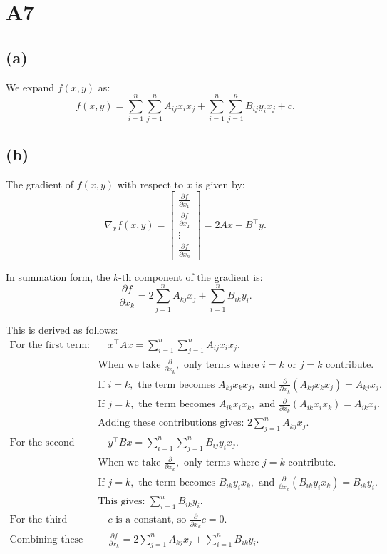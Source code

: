 \documentclass{article}
\begin{document}
\section*{A7}

\subsection*{(a)}
We expand \(f(x, y)\) as:
\[
f(x, y) = \sum_{i=1}^n \sum_{j=1}^n A_{ij} x_i x_j + \sum_{i=1}^n \sum_{j=1}^n B_{ij} y_i x_j + c.
\]

\subsection*{(b)}
The gradient of \(f(x, y)\) with respect to \(x\) is given by:
\[
\nabla_x f(x, y) = \begin{bmatrix}
\frac{\partial f}{\partial x_1} \\
\frac{\partial f}{\partial x_2} \\
\vdots \\
\frac{\partial f}{\partial x_n}
\end{bmatrix}
= 2A x + B^\top y.
\]

In summation form, the \(k\)-th component of the gradient is:
\[
\frac{\partial f}{\partial x_k} = 2 \sum_{j=1}^n A_{kj} x_j + \sum_{i=1}^n B_{ik} y_i.
\]

This is derived as follows:
\begin{align*}
\text{For the first term: } & \quad 
x^\top A x = \sum_{i=1}^n \sum_{j=1}^n A_{ij} x_i x_j. \\
& \text{When we take } \frac{\partial}{\partial x_k}, \text{ only terms where } i = k \text{ or } j = k \text{ contribute.} \\
& \text{If } i = k, \text{ the term becomes } A_{kj} x_k x_j, \text{ and } \frac{\partial}{\partial x_k}(A_{kj} x_k x_j) = A_{kj} x_j. \\
& \text{If } j = k, \text{ the term becomes } A_{ik} x_i x_k, \text{ and } \frac{\partial}{\partial x_k}(A_{ik} x_i x_k) = A_{ik} x_i. \\
& \text{Adding these contributions gives: } 2 \sum_{j=1}^n A_{kj} x_j. \\[10pt]
\text{For the second term: } & \quad 
y^\top B x = \sum_{i=1}^n \sum_{j=1}^n B_{ij} y_i x_j. \\
& \text{When we take } \frac{\partial}{\partial x_k}, \text{ only terms where } j = k \text{ contribute.} \\
& \text{If } j = k, \text{ the term becomes } B_{ik} y_i x_k, \text{ and } \frac{\partial}{\partial x_k}(B_{ik} y_i x_k) = B_{ik} y_i. \\
& \text{This gives: } \sum_{i=1}^n B_{ik} y_i. \\[10pt]
\text{For the third term: } & \quad 
c \text{ is a constant, so } \frac{\partial}{\partial x_k} c = 0. \\[10pt]
\text{Combining these results: } & \quad 
\frac{\partial f}{\partial x_k} = 2 \sum_{j=1}^n A_{kj} x_j + \sum_{i=1}^n B_{ik} y_i.
\end{align*}
\end{document}
